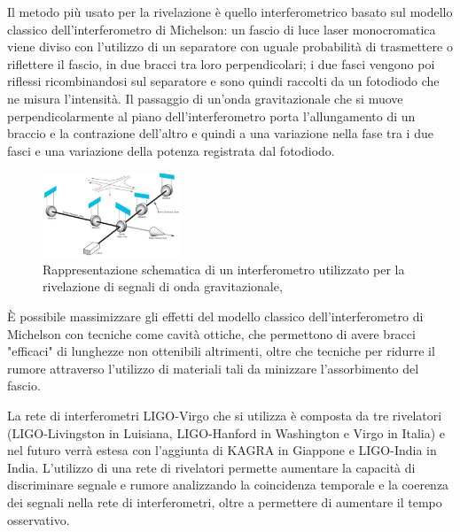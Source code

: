 Il metodo più usato per la rivelazione è quello interferometrico basato sul modello classico dell'interferometro di Michelson: un fascio di luce laser monocromatica viene diviso con l'utilizzo di un separatore con uguale probabilità di trasmettere o riflettere il fascio, in due bracci tra loro perpendicolari; i due fasci vengono poi riflessi ricombinandosi sul separatore  e sono quindi raccolti da un fotodiodo che ne misura l'intensità. Il passaggio di un'onda gravitazionale che si muove perpendicolarmente al piano dell'interferometro porta l'allungamento di un braccio e la contrazione dell'altro e quindi a una variazione nella fase tra i due fasci e una variazione della potenza registrata dal fotodiodo.\\
\begin{figure}
	\vspace{-25pt}
	\begin{center}
		\includegraphics[width=0.37\textwidth]{figures/Capitolo_1/michelson.jpg}
	\end{center}
	\vspace{-7pt}
	\caption{Rappresentazione schematica di un interferometro utilizzato per la rivelazione di segnali di onda gravitazionale, \cite{wiki_ligo}}
	\label{fig:michelson}
	\vspace{-15pt}
\end{figure}
È possibile massimizzare gli effetti del modello classico dell'interferometro di Michelson con tecniche come cavità ottiche, che permettono di avere bracci "efficaci" di lunghezze non ottenibili altrimenti, oltre che tecniche per ridurre il rumore attraverso l'utilizzo di materiali tali da minizzare l'assorbimento del fascio.

La rete di interferometri LIGO-Virgo che si utilizza è composta da tre rivelatori (LIGO-Livingston in Luisiana, LIGO-Hanford in Washington e Virgo in Italia) e nel futuro verrà estesa con l'aggiunta di KAGRA in Giappone e LIGO-India in India. L'utilizzo di una rete di rivelatori permette aumentare la capacità di discriminare segnale e rumore analizzando la coincidenza temporale e la coerenza dei segnali nella rete di interferometri, oltre a permettere di aumentare il tempo osservativo.
